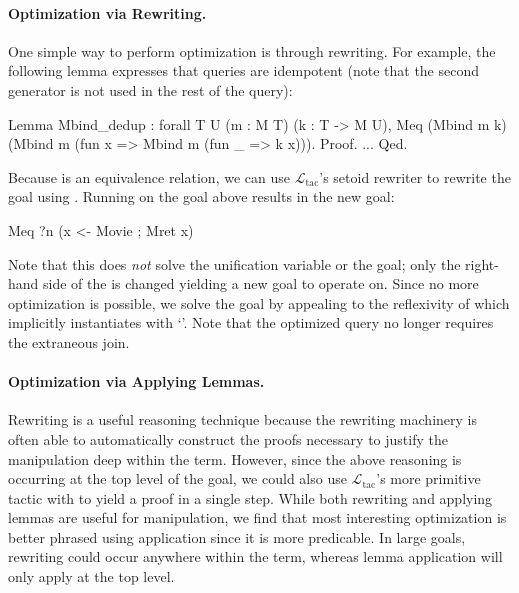 \documentclass[preprint]{sigplanconf}
\newcommand{\ltac}[0]{\ensuremath{\mathcal{L}_{\mathrm{tac}}}}
\begin{document}
\paragraph{Optimization via Rewriting.}
One simple way to perform optimization is through rewriting.
For example, the following lemma expresses that queries are idempotent (note that the second generator is not used in the rest of the query):
\begin{coq}
Lemma Mbind_dedup : forall {T U} (m : M T) (k : T -> M U),
  Meq (Mbind m k) (Mbind m (fun x => Mbind m (fun _ => k x))).
Proof. ... Qed.
\end{coq}
Because  is an equivalence relation, we can use \ltac's setoid rewriter to rewrite the goal using .
Running  on the goal above results in the new goal:
\begin{coq}
Meq ?n (x <- Movie ; Mret x)
\end{coq}
Note that this does \emph{not} solve the unification variable  or the goal; only the right-hand side of the  is changed yielding a new goal to operate on.
Since no more optimization is possible, we solve the goal by appealing to the reflexivity of  which implicitly instantiates  with `'.
Note that the optimized query no longer requires the extraneous join.

\paragraph{Optimization via Applying Lemmas.}
Rewriting is a useful reasoning technique because the rewriting machinery is often able to automatically construct the proofs necessary to justify the manipulation deep within the term.
However, since the above reasoning is occurring at the top level of the goal, we could also use \ltac's more primitive  tactic with  to yield a proof in a single step.
While both rewriting and applying lemmas are useful for manipulation, we find that most interesting optimization is better phrased using application since it is more predicable.
In large goals, rewriting could occur anywhere within the term, whereas lemma application will only apply at the top level.
\end{document}

